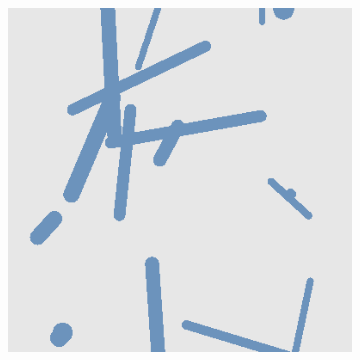 \begin{figure}[H]
\begin{subfigure}{\w}
    \end{subfigure}
    \hspace*{\fill}
    \begin{subfigure}{\w}
        \includegraphics[width=\linewidth]{figures/generated-worlds/world_2.png}
    \end{subfigure}

    \vspace{4mm}


\end{figure}
